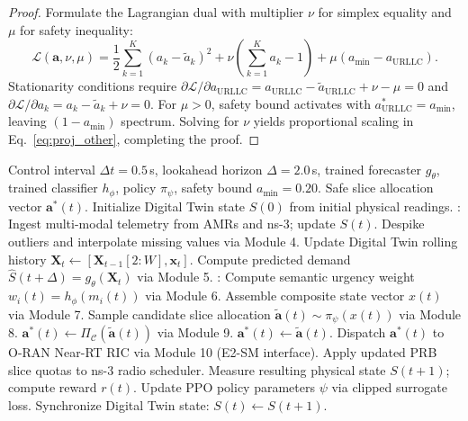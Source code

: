 \documentclass[twocolumn,10pt,twoside]{article}
\begin{document}
\begin{proof}
Formulate the Lagrangian dual with multiplier $\nu$ for simplex equality and $\mu$ for safety inequality:
\begin{equation}
\mathcal{L}(\mathbf{a}, \nu, \mu) = \frac{1}{2}\sum_{k=1}^K (a_k - \tilde{a}_k)^2 + \nu \left(\sum_{k=1}^K a_k - 1\right) + \mu(a_{\min} - a_{\text{URLLC}}).
\label{eq:lagrangian}
\end{equation}
Stationarity conditions require $\partial\mathcal{L}/\partial a_{\text{URLLC}} = a_{\text{URLLC}} - \tilde{a}_{\text{URLLC}} + \nu - \mu = 0$ and $\partial\mathcal{L}/\partial a_k = a_k - \tilde{a}_k + \nu = 0$. For $\mu > 0$, safety bound activates with $a^*_{\text{URLLC}} = a_{\min}$, leaving $(1 - a_{\min})$ spectrum. Solving for $\nu$ yields proportional scaling in Eq.~\eqref{eq:proj_other}, completing the proof.
\end{proof}

\begin{algorithm}[t]
\caption{CogniNet-6G Closed-Loop Orchestration}
\label{alg:cogninet}
\small
\begin{algorithmic}[1]
\Require Control interval $\Delta t = 0.5$\,s, lookahead horizon $\Delta = 2.0$\,s, trained forecaster $g_\theta$, trained classifier $h_\phi$, policy $\pi_\psi$, safety bound $a_{\min}=0.20$.
\Ensure Safe slice allocation vector $\mathbf{a}^*(t)$.
\State Initialize Digital Twin state $S(0)$ from initial physical readings.
:
    \State Ingest multi-modal telemetry from AMRs and ns-3; update $S(t)$.
    \State Despike outliers and interpolate missing values via Module 4.
    \State Update Digital Twin rolling history $\mathbf{X}_t \leftarrow [\mathbf{X}_{t-1}[2:W], \mathbf{x}_t]$.
    \State Compute predicted demand $\hat{S}(t + \Delta) = g_\theta(\mathbf{X}_t)$ via Module 5.
    :
        \State Compute semantic urgency weight $w_i(t) = h_\phi(m_i(t))$ via Module 6.
    \EndFor
    \State Assemble composite state vector $x(t)$ via Module 7.
    \State Sample candidate slice allocation $\tilde{\mathbf{a}}(t) \sim \pi_\psi(x(t))$ via Module 8.
        \State $\mathbf{a}^*(t) \leftarrow \Pi_{\mathcal{C}}(\tilde{\mathbf{a}}(t))$ via Module 9. 
    \Else
        \State $\mathbf{a}^*(t) \leftarrow \tilde{\mathbf{a}}(t)$.
    \EndIf
    \State Dispatch $\mathbf{a}^*(t)$ to O-RAN Near-RT RIC via Module 10 (E2-SM interface).
    \State Apply updated PRB slice quotas to ns-3 radio scheduler.
    \State Measure resulting physical state $S(t+1)$; compute reward $r(t)$.
        \State Update PPO policy parameters $\psi$ via clipped surrogate loss.
    \EndIf
    \State Synchronize Digital Twin state: $S(t) \leftarrow S(t + 1)$.
\EndFor
\end{algorithmic}
\end{algorithm}
\end{document}
